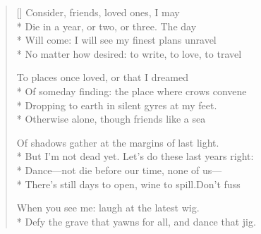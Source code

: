 \label{ch:banish_misfortune}
\settowidth{\versewidth}{There's still days to open, wine to spill.\quad Don't fuss}
\begin{verse}[\versewidth]
Consider, friends, loved ones, I may\\*
Die in a year, or two, or three.   The day\\*
Will come: I will see my finest plans unravel\\*
No matter how desired: to write, to love, to travel

To places once loved, or that I dreamed\\*
Of someday finding: the place where crows convene\\*
Dropping to earth in silent gyres at my feet.\\*
Otherwise alone, though friends like a sea

Of shadows gather at the margins of last light.\\*
But I'm not dead yet. Let's do these last years right:\\*
Dance---not die before our time, none of us---\\*
There's still days to open, wine to spill.\quad Don't fuss

When you see me: laugh at the latest wig.\\*
Defy the grave that yawns for all, and dance that jig.
\end{verse}
